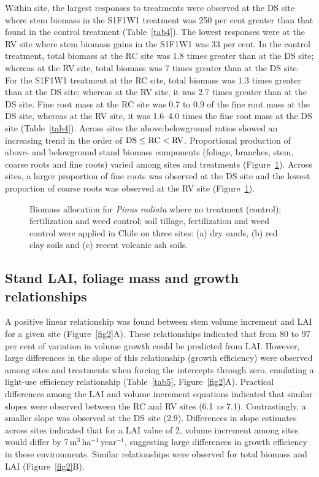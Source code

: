 \documentclass[final]{foresj}
\begin{document}
Within site, the largest responses to treatments were
observed at the DS site where stem biomass in the S1F1W1
treatment was 250 per cent greater than that found in the
control treatment (Table~\ref{tab4}). The lowest responses
were at the RV site where stem biomass gains in the S1F1W1
was 33 per cent. In the control treatment, total biomass at
the RC site was 1.8 times greater than at the DS site;
whereas at the RV site, total biomass was 7 times greater
than at the DS site. For the S1F1W1 treatment at the RC
site, total biomass was 1.3 times greater than at the DS
site; whereas at the RV site, it was 2.7 times greater than
at the DS site. Fine root mass at the RC site was 0.7 to
0.9 of the fine root mass at the DS site, whereas at the RV
site, it was 1.6--4.0 times the fine root mass at the DS
site (Table~\ref{tab4}). Across sites the above:belowground
ratios showed an increasing trend in the order of
$\hbox{DS} \le \hbox{RC} < \hbox{RV}$. Proportional
production of above- and belowground stand biomass
components (foliage, branches, stem, coarse roots and fine
roots) varied among sites and treatments
(Figure~\ref{fig1}). Across sites, a larger proportion of
fine roots was observed at the DS site and the lowest
proportion of coarse roots was observed at the RV site\break
(Figure~\ref{fig1}).

\begin{figure}[!b]
\caption{Biomass allocation for \textit{Pinus radiata} where no treatment (control); fertilization and
weed control; soil tillage, fertilization and weed control were applied in
Chile on three sites: (a) dry sands, (b) red clay soils and (c) recent
volcanic ash soils.\label{fig1}}
\end{figure}

\subsection{Stand LAI, foliage mass and growth relationships}

A positive linear relationship was found between stem
volume increment and LAI for a given site
(Figure~\ref{fig2}A). These relationships indicated that
from 80 to 97 per cent of variation in \hbox{volume} growth could
be predicted from LAI. However, large differences in the
slope of this relationship (growth efficiency) were
observed among sites and treatments when forcing the
intercepts through zero, emulating a light-use efficiency
relationship\cite{46} (Table~\ref{tab5},
Figure~\ref{fig2}A). Practical differences among the LAI
and volume increment equations indicated that similar
slopes were observed between the RC and RV sites (6.1
\textit{vs} 7.1). Contrastingly, a smaller slope was
observed at the DS site (2.9). Differences in slope
estimates across sites indicated that for a LAI value of 2,
volume increment among sites would differ by
7\,m$^{3}$\,ha$^{-1}$\,year$^{-1}$, suggesting large
differences in growth efficiency in these environments.
Similar relationships were observed for total biomass and
LAI (Figure~\ref{fig2}B).
\end{document}
